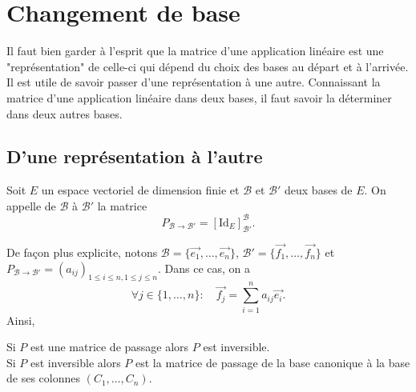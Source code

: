 \documentclass{book}
\begin{document}
\section{Changement de base}
Il faut bien garder à l'esprit que la matrice d'une application linéaire est une "représentation"
de celle-ci qui dépend du choix des bases au départ et à l'arrivée. Il est utile de savoir passer
d'une représentation à une autre. Connaissant la matrice d'une application linéaire dans deux
bases, il faut savoir la déterminer dans deux autres bases.
\subsection{D'une représentation à l'autre}
\begin{Definition}
Soit $E$ un espace vectoriel de dimension finie et  $\mathcal{B}$ et $\mathcal{B}'$ deux bases de $E$.
On appelle  de $\mathcal{B}$ à $\mathcal{B}'$ la matrice
\[ P_{\mathcal{B}\to\mathcal{B}'} = [\mathrm{Id}_E]_{\mathcal{B}'}^{\mathcal{B}}. \]

De façon plus explicite, notons $\mathcal{B} = \{\vec{e_1},\dots,\vec{e_n}\}$,
$\mathcal{B}' = \{\vec{f_1},\dots,\vec{f_n}\}$ et $P_{\mathcal{B}\to\mathcal{B}'} = ( a_{ij} )_{1\leq i \leq n,1\leq j \leq n}$.
Dans ce cas, on a
\[ \forall   j \in   \{1,\dots,n\}:\quad \vec{f_j} = \sum  _{i=1}^n a_{ij} \vec{e_i}. \]
Ainsi,
\begin{center}
\end{center}
\end{Definition}
\begin{Proposition}[Inversible]
Si $P$ est une matrice de passage alors $P$ est inversible.\\
Si  $P$ est inversible alors $P$ est la matrice de passage de la base canonique à la base de ses colonnes $(C_1,\dots, C_n)$.
\end{Proposition}
\end{document}
